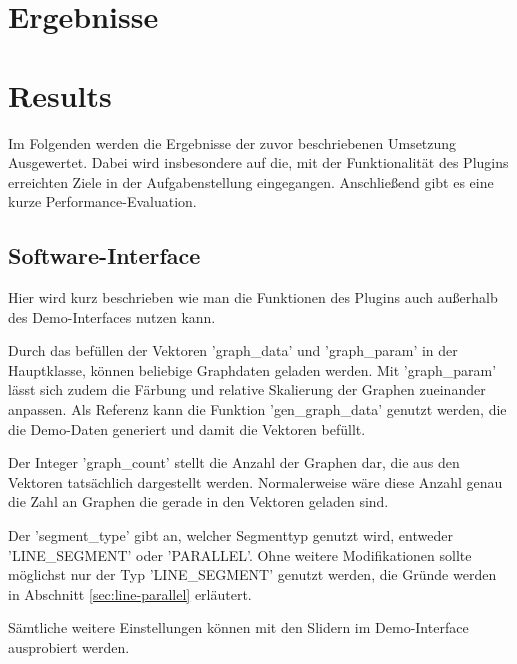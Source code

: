 {\chapter{Ergebnisse}}
{\chapter{Results}}

\label{sec:results}
Im Folgenden werden die Ergebnisse der zuvor beschriebenen Umsetzung Ausgewertet.
Dabei wird insbesondere auf die, mit der Funktionalität des Plugins erreichten Ziele in der Aufgabenstellung eingegangen.
Anschließend gibt es eine kurze Performance-Evaluation.

\section{Software-Interface}
Hier wird kurz beschrieben wie man die Funktionen des Plugins auch außerhalb des Demo-Interfaces nutzen kann.
\par
Durch das befüllen der Vektoren 'graph\_data' und 'graph\_param' in der Hauptklasse, können beliebige Graphdaten geladen werden.
Mit 'graph\_param' lässt sich zudem die Färbung und relative Skalierung der Graphen zueinander anpassen.
Als Referenz kann die Funktion 'gen\_graph\_data' genutzt werden, die die Demo-Daten generiert und damit die Vektoren befüllt.
\par
Der Integer 'graph\_count' stellt die Anzahl der Graphen dar, die aus den Vektoren tatsächlich dargestellt werden.
Normalerweise wäre diese Anzahl genau die Zahl an Graphen die gerade in den Vektoren geladen sind.
\par
Der 'segment\_type' gibt an, welcher Segmenttyp genutzt wird, entweder 'LINE\_SEGMENT' oder 'PARALLEL'.
Ohne weitere Modifikationen sollte möglichst nur der Typ 'LINE\_SEGMENT' genutzt werden, die Gründe werden in Abschnitt \ref{sec:line-parallel} erläutert.
\par
Sämtliche weitere Einstellungen können mit den Slidern im Demo-Interface ausprobiert werden.

